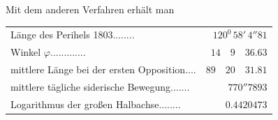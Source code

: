 Mit dem anderen Verfahren erhält man
\begin{center}\fontsize{9}{11}\selectfont
\begin{tabular}{@{}p{.69\linewidth}@{\quad}r@{}}
Länge des Perihels 1803\hfill\mbox{.\hspace{.76em}.\hspace{.76em}.\hspace{.76em}.\hspace{.76em}.\hspace{.76em}.\hspace{.76em}.\hspace{.76em}.}&$120^0\,58'\,4''81$\\
Winkel $\varphi$\hfill\mbox{.\hspace{.76em}.\hspace{.76em}.\hspace{.76em}.\hspace{.76em}.\hspace{.76em}.\hspace{.76em}.\hspace{.76em}.\hspace{.76em}.\hspace{.76em}.\hspace{.76em}.\hspace{.76em}.\hspace{.76em}.}&$14\quad9\quad36.63$\\
mittlere Länge bei der ersten Opposition\hfill\mbox{.\hspace{.76em}.\hspace{.76em}.\hspace{.76em}.}&$89\quad20\quad31.81$\\
mittlere tägliche siderische Bewegung\hfill\mbox{.\hspace{.76em}.\hspace{.76em}.\hspace{.76em}.\hspace{.76em}.\hspace{.76em}.\hspace{.76em}.}&$770''7893$\\
Logarithmus der großen Halbachse\hfill\mbox{.\hspace{.76em}.\hspace{.76em}.\hspace{.76em}.\hspace{.76em}.\hspace{.76em}.\hspace{.76em}.\hspace{.76em}.}&$0.4420473$
\end{tabular}
\end{center}

